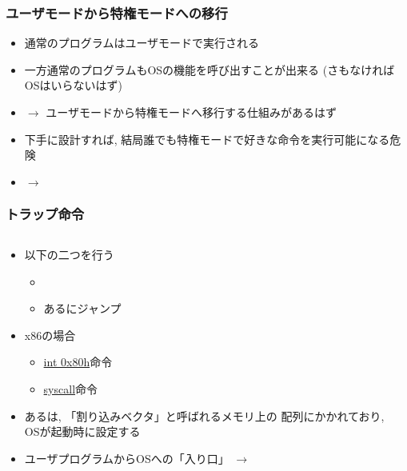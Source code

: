 \documentclass[12pt,dvipdfmx]{beamer}
\begin{document}
\begin{frame}
\frametitle{ユーザモードから特権モードへの移行}
\begin{itemize}
\item<1-> 通常のプログラムはユーザモードで実行される
\item<1-> 一方通常のプログラムもOSの機能を呼び出すことが出来る
  (さもなければOSはいらないはず)
\item<2-> $\rightarrow$ ユーザモードから特権モードへ移行する仕組みがあるはず
\item<3-> 下手に設計すれば,
  結局誰でも特権モードで好きな命令を実行可能になる危険
\item<4-> $\rightarrow$ 
\end{itemize}
\end{frame}

\begin{frame}
\frametitle{トラップ命令}
\begin{columns}
  \begin{column}{0.6\textwidth}
    \begin{itemize}
    \item 以下の二つを行う
      \begin{itemize}
      \item {}
      \item あるにジャンプ
      \end{itemize}
    \item x86の場合
      \begin{itemize}
      \item \href{https://www.felixcloutier.com/x86/syscall}{int 0x80h}命令
      \item \href{https://www.felixcloutier.com/x86/syscall}{syscall}命令
      \end{itemize}
    \item<2-> あるは,
      「割り込みベクタ」と呼ばれるメモリ上の
      配列にかかれており, OSが起動時に設定する
    \item<4-> ユーザプログラムからOSへの「入り口」
      $\rightarrow$ 
    \end{itemize}
  \end{column}
  \begin{column}{0.4\textwidth}
  \end{column}
\end{columns}
\end{frame}
\end{document}
